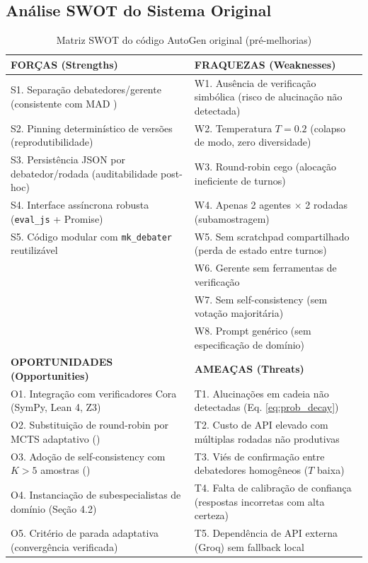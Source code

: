 \documentclass[5p]{elsarticle}
\theoremstyle{remark}
\begin{document}
\subsection{Análise SWOT do Sistema Original}

\begin{table}[htbp]
\centering
\caption{Matriz SWOT do código AutoGen original (pré-melhorias)}
\label{tab:swot_antes}
\begin{tabular}{L{6cm} L{6cm}}
\toprule
{}
\textbf{FORÇAS (Strengths)} & \textbf{FRAQUEZAS (Weaknesses)} \\
\midrule
S1. Separação debatedores/gerente (consistente com MAD \cite{Liang2023MAD}) & W1. Ausência de verificação simbólica (risco de alucinação não detectada) \\
S2. Pinning determinístico de versões (reprodutibilidade) & W2. Temperatura $T=0.2$ (colapso de modo, zero diversidade) \\
S3. Persistência JSON por debatedor/rodada (auditabilidade post-hoc) & W3. Round-robin cego (alocação ineficiente de turnos) \\
S4. Interface assíncrona robusta (\texttt{eval\_js} + Promise) & W4. Apenas 2 agentes $\times$ 2 rodadas (subamostragem) \\
S5. Código modular com \texttt{mk\_debater} reutilizável & W5. Sem scratchpad compartilhado (perda de estado entre turnos) \\
& W6. Gerente sem ferramentas de verificação \\
& W7. Sem self-consistency (sem votação majoritária) \\
& W8. Prompt genérico (sem especificação de domínio) \\
\midrule
{}
\textbf{OPORTUNIDADES (Opportunities)} & \textbf{AMEAÇAS (Threats)} \\
\midrule
O1. Integração com verificadores Cora (SymPy, Lean 4, Z3) & T1. Alucinações em cadeia não detectadas (Eq. \ref{eq:prob_decay}) \\
O2. Substituição de round-robin por MCTS adaptativo (\cite{Silver2016AlphaGo}) & T2. Custo de API elevado com múltiplas rodadas não produtivas \\
O3. Adoção de self-consistency com $K > 5$ amostras (\cite{Wang2022SelfConsistency}) & T3. Viés de confirmação entre debatedores homogêneos ($T$ baixa) \\
O4. Instanciação de subespecialistas de domínio (Seção 4.2) & T4. Falta de calibração de confiança (respostas incorretas com alta certeza) \\
O5. Critério de parada adaptativa (convergência verificada) & T5. Dependência de API externa (Groq) sem fallback local \\
\bottomrule
\end{tabular}
\end{table}
\end{document}
